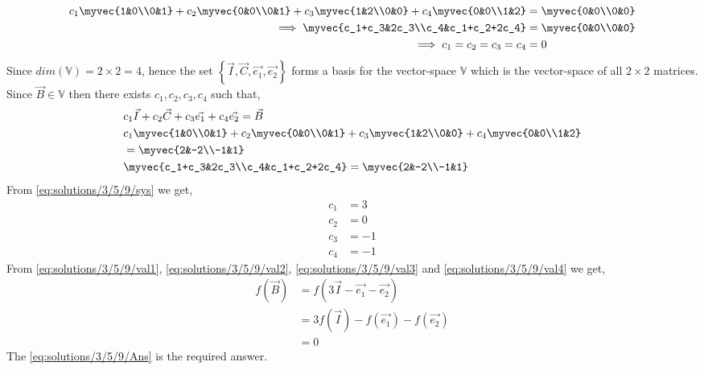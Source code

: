 \begin{align}
c_1\myvec{1&0\\0&1}+c_2\myvec{0&0\\0&1}+c_3\myvec{1&2\\0&0}+c_4\myvec{0&0\\1&2} &= \myvec{0&0\\0&0}\\
\implies \myvec{c_1+c_3&2c_3\\c_4&c_1+c_2+2c_4} &= \myvec{0&0\\0&0}\\
\implies c_1 = c_2 = c_3 = c_4 &= 0\label{eq:solutions/3/5/9/ind}
\end{align}
Since $dim(\mathbb{V}) = 2\times2 = 4$, hence the set $\left\{\vec{I},\vec{C},\vec{e_1}, \vec{e_2}\right\}$ forms a basis for the vector-space $\mathbb{V}$ which is the vector-space of all $2 \times 2$ matrices.\\
Since $\vec{B} \in \mathbb{V}$ then there exists $c_1,c_2,c_3,c_4$ such that,
\begin{align}
&c_1\vec{I}+c_2\vec{C}+c_3\vec{e_1}+c_4\vec{e_2} =\vec{B}\\
&c_1\myvec{1&0\\0&1}+c_2\myvec{0&0\\0&1}+c_3\myvec{1&2\\0&0}+c_4\myvec{0&0\\1&2}\\
&=\myvec{2&-2\\-1&1}\\
&\myvec{c_1+c_3&2c_3\\c_4&c_1+c_2+2c_4} = \myvec{2&-2\\-1&1}\label{eq:solutions/3/5/9/sys}
\end{align}
From \eqref{eq:solutions/3/5/9/sys} we get,
\begin{align}
c_1 &= 3\label{eq:solutions/3/5/9/val1}\\
c_2 &= 0\label{eq:solutions/3/5/9/val2}\\
c_3 &= -1\label{eq:solutions/3/5/9/val3}\\
c_4 &= -1\label{eq:solutions/3/5/9/val4}
\end{align}
From \eqref{eq:solutions/3/5/9/val1}, \eqref{eq:solutions/3/5/9/val2}, \eqref{eq:solutions/3/5/9/val3} and \eqref{eq:solutions/3/5/9/val4} we get,
\begin{align}
f(\vec{B}) &= f(3\vec{I}-\vec{e_1}-\vec{e_2})\\
&= 3f(\vec{I})-f(\vec{e_1})-f(\vec{e_2})\\
&= 0\label{eq:solutions/3/5/9/Ans}
\end{align}
The \eqref{eq:solutions/3/5/9/Ans} is the required answer.
